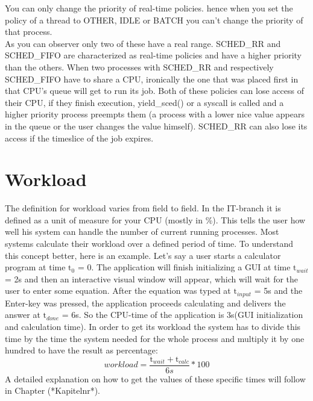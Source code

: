 You can only change the priority of real-time policies. hence when you set the policy of a thread to OTHER, IDLE or BATCH you can't change the priority of that process.\\
As you can observer only two of these have a \dq real\dq{} range.
SCHED\_RR and SCHED\_FIFO are characterized as real-time policies and have a higher priority than the
others. When two processes with SCHED\_RR and respectively SCHED\_FIFO have to share a CPU,
ironically the one that was placed first in that CPU's queue will get to run its job. Both of these
policies can lose access of their CPU, if they finish execution, yield\_sced() or a syscall is called
and a higher priority process preempts them (a process with a lower nice value appears in the queue
or the user changes the value himself). SCHED\_RR can also lose its access if the timeslice of
the job expires.

\section{Workload}
The definition for workload varies from field to field. In the IT-branch it is defined as a unit of measure for your CPU (mostly in \%). This tells the user how well his system can handle the number of current running processes. Most systems calculate their workload over a defined period of time. To understand this concept better, here is an example. Let's say a user starts a calculator program at time $\mathrm{t}_0$ = 0. The application will finish initializing a GUI at time $\mathrm{t}_{wait}$ = 2s and then an interactive visual window will appear, which will wait for the user to enter some equation.
After the equation was typed at $\mathrm{t}_{input}$ = 5s and the \dq Enter\dq{}-key was pressed, the application proceeds calculating and delivers the answer at $\mathrm{t}_{done}$ = 6s. So the CPU-time of the application is 3s(GUI initialization and calculation time). In order to get its workload the system has to divide this time by the time the system needed for the whole process and multiply it by one hundred to have the result as percentage:
\begin{equation}
	workload =  \frac{\mathrm{t}_{wait}+\mathrm{t}_{calc}}{6s}*100
\end{equation} 
A detailed explanation on how to get the values of these specific times will follow in Chapter (*Kapitelnr*).

